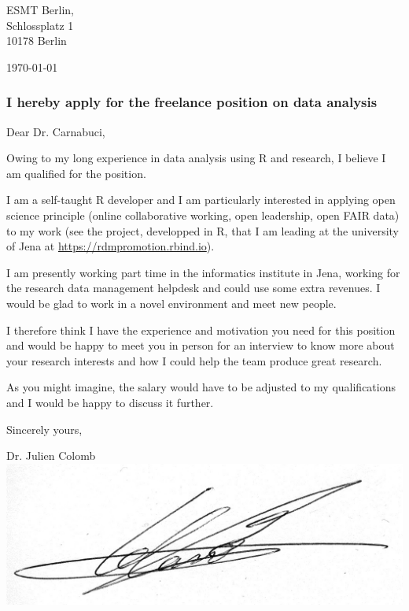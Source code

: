 \hspace*{0.5\linewidth}
\begin{minipage}{0.4\linewidth}
ESMT Berlin, \\
Schlossplatz 1\\
 10178 Berlin\\

\end{minipage}


\today


%
\subsubsection* {I hereby apply for the freelance position on data analysis}
  

Dear Dr. Carnabuci,

Owing to my long experience in data analysis using R and research, I believe I am qualified for the position.

I am a self-taught R developer and I am particularly interested in applying open science principle (online collaborative working, open leadership, open FAIR data) to my work (see the project, developped in R, that I am leading at the university of Jena at  \url{https://rdmpromotion.rbind.io}).

I am presently working part time in the informatics institute in Jena, working for the research data management helpdesk and could use some extra revenues. I would be glad to work in a novel environment and meet new people. 

I therefore think I have the experience and motivation you need for this position and would be happy to meet you in person for an interview to know more about your research interests and how I could help the team produce great research.

 As you might imagine, the salary would have to be adjusted to my qualifications and I would be happy to discuss it further.



 
Sincerely yours,\\

\hspace*{0.5\linewidth}
\begin{minipage}{0.3\linewidth}

Dr. Julien Colomb\\
\includegraphics[height=2\baselineskip]{Figures/signature.jpg}
\end{minipage}





